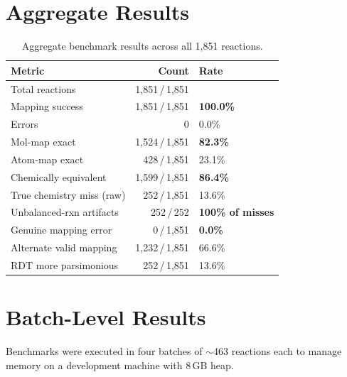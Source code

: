 \documentclass[11pt,a4paper]{article}
\begin{document}
\section{Aggregate Results}

\begin{table}[H]
\centering
\begin{tabular}{lrl}
\toprule
\textbf{Metric} & \textbf{Count} & \textbf{Rate} \\
\midrule
Total reactions         & 1,851\,/\,1,851 & \\
Mapping success         & 1,851\,/\,1,851 & \textbf{100.0\%} \\
Errors                  & 0               & 0.0\% \\
\addlinespace
Mol-map exact           & 1,524\,/\,1,851 & \textbf{82.3\%} \\
Atom-map exact          & 428\,/\,1,851   & 23.1\% \\
Chemically equivalent   & 1,599\,/\,1,851 & \textbf{86.4\%} \\
\addlinespace
True chemistry miss (raw) & 252\,/\,1,851 & 13.6\% \\
\rowcolor{rdtgreen!8}
Unbalanced-rxn artifacts  & 252\,/\,252   & \textbf{100\% of misses} \\
\rowcolor{rdtgreen!8}
Genuine mapping error     & 0\,/\,1,851   & \textbf{0.0\%} \\
\addlinespace
Alternate valid mapping   & 1,232\,/\,1,851 & 66.6\% \\
RDT more parsimonious     & 252\,/\,1,851   & 13.6\% \\
\bottomrule
\end{tabular}
\caption{Aggregate benchmark results across all 1,851 reactions.}
\label{tab:aggregate}
\end{table}


\section{Batch-Level Results}

Benchmarks were executed in four batches of $\sim$463 reactions each to manage
memory on a development machine with 8\,GB heap.
\end{document}
